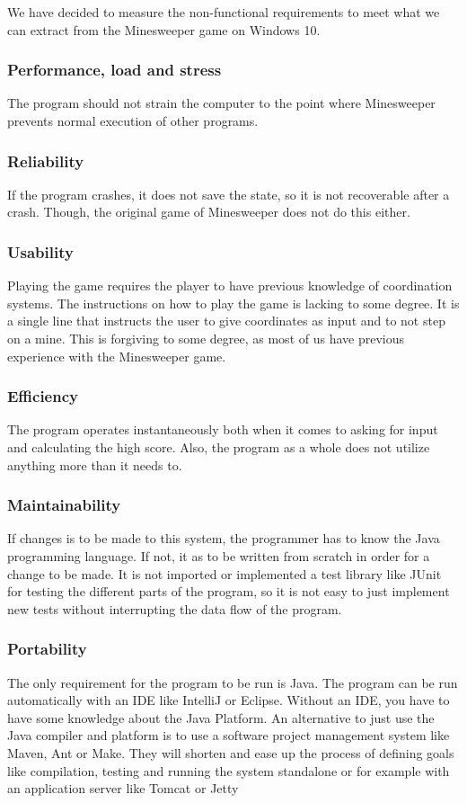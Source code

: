 \documentclass[UKenglish]{article}  %
\begin{document}
We have decided to measure the non-functional requirements to meet what we can
extract from the Minesweeper game on Windows 10.

\subsubsection{Performance, load and stress}
The program should not strain the computer to the point where Minesweeper
prevents normal execution of other programs. 

\subsubsection{Reliability}
If the program crashes, it does not save the state, so it is not recoverable
after a crash. Though, the original game of Minesweeper does not do this either.

\subsubsection{Usability}
Playing the game requires the player to have previous knowledge of coordination
systems. The instructions on how to play the game is lacking to some degree. It
is a single line that instructs the user to give coordinates as input and to not
step on a mine. This is forgiving to some degree, as most of us have previous
experience with the Minesweeper game.

\subsubsection{Efficiency}
The program operates instantaneously both when it comes to asking for input and
calculating the high score. Also, the program as a whole does not utilize
anything more than it needs to.

\subsubsection{Maintainability} %
If changes is to be made to this system, the programmer has to know the Java
programming language. If not, it as to be written from scratch in order for a
change to be made. It is not imported or implemented a test library like JUnit
for testing the different parts of the program, so it is not easy to just
implement new tests without interrupting the data flow of the program.

\subsubsection{Portability}
The only requirement for the program to be run is Java. The program can be run
automatically with an IDE like IntelliJ or Eclipse. Without an IDE, you have to
have some knowledge about the Java Platform. An alternative to just use the Java
compiler and platform is to use a software project management system like Maven,
Ant or Make. They will shorten and ease up the process of defining goals like
compilation, testing and running the system standalone or for example with an
application server like Tomcat or Jetty
\end{document}
